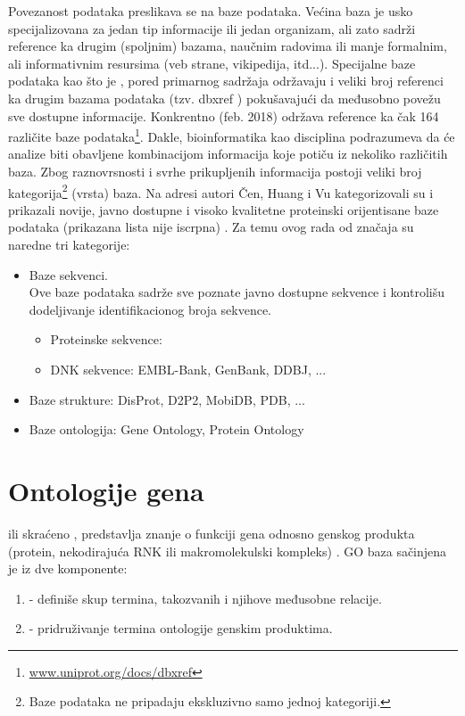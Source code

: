 Povezanost podataka preslikava se na baze podataka. Većina baza je usko specijalizovana
za jedan tip informacije ili jedan organizam, ali zato sadrži reference ka
drugim (spoljnim) bazama, naučnim radovima ili  manje formalnim, ali
informativnim resursima (veb strane, vikipedija, itd...). Specijalne baze podataka kao
što je \uniprotkb, pored primarnog sadržaja održavaju i veliki broj referenci ka
drugim bazama podataka (tzv. dbxref ) pokušavajući
da međusobno povežu sve dostupne informacije. Konkrentno \uniprotkb (feb. 2018)
održava reference ka čak 164 različite baze
podataka\footnote{\url{www.uniprot.org/docs/dbxref}}.  Dakle, bioinformatika
kao disciplina podrazumeva da će analize biti obavljene kombinacijom informacija koje
potiču iz nekoliko različitih baza.  Zbog raznovrsnosti i svrhe prikupljenih
informacija postoji veliki broj kategorija\footnote{Baze podataka ne pripadaju
ekskluzivno samo jednoj kategoriji.} (vrsta) baza. Na adresi \cite{dbSummary2015}
autori Čen, Huang i Vu kategorizovali su i prikazali novije, javno dostupne i
visoko kvalitetne proteinski orijentisane baze podataka (prikazana lista nije
iscrpna) \parencite{Chen2017}.  Za temu ovog rada od značaja su naredne tri
kategorije:

\begin{itemize}
  \item Baze sekvenci.\\ 
        Ove baze podataka sadrže sve poznate javno dostupne sekvence i kontrolišu dodeljivanje 
        identifikacionog broja sekvence.
    \begin{itemize}
      \item Proteinske sekvence: \uniprotkb
      \item DNK sekvence: EMBL-Bank, GenBank, DDBJ, ...
    \end{itemize}
  \item Baze strukture: DisProt, D2P2, MobiDB, PDB, ...
  \item Baze ontologija: Gene Ontology, Protein Ontology
\end{itemize}


\section{Ontologije gena}
\label{GO}

  ili skraćeno , 
predstavlja znanje o funkciji gena odnosno genskog
produkta (protein, nekodirajuća RNK ili makromolekulski kompleks)
\parencite{GO2016}.
GO baza sačinjena je iz dve komponente:
\begin{enumerate}
  \item {} - definiše skup termina, takozvanih
      i njihove međusobne relacije.
  \item {} - pridruživanje termina ontologije genskim produktima.
\end{enumerate}

